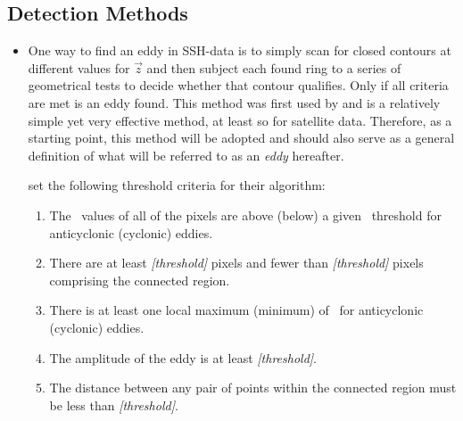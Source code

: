 \subsection{Detection Methods} \label{subsec:detectmethods}
\begin{itemize}

	\item
	One way to find an eddy in SSH-data is to simply scan for closed contours at different values for $\vec{z}$ and then subject each found ring to a series of geometrical tests to decide whether that contour qualifies. Only if all criteria are met is an eddy found. This method was first used by \citet{Chelton2011} and is a relatively simple yet very effective method, at least so for satellite data. Therefore, as a starting point, this method will be adopted and should also serve as a general definition of what will be referred to as an \textit{eddy} hereafter.
	
 set the following threshold criteria for their algorithm:
	\begin{enumerate}
		\item
		The \SSH~values of all of the pixels are above (below) a given \SSH~threshold for anticyclonic (cyclonic) eddies.
		\item
		There are at least \textit{[threshold]} pixels and fewer than \textit{[threshold]} pixels comprising the connected region.
		\item
		There is at least one local maximum (minimum) of \SSH~for anticyclonic (cyclonic) eddies.
		\item
		The amplitude of the eddy is at least \textit{[threshold]}.
		\item
		The distance between any pair of points within the connected region must be less than \textit{[threshold]}.
	\end{enumerate}


\end{itemize}
